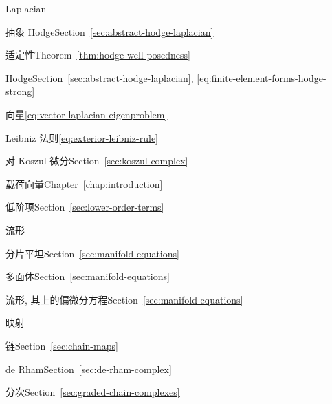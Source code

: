\begin{theindex}
\item {}\label{index:laplacian}{Laplacian}

\subitem {}\label{index:laplacian-abstract-hodge}{抽象 Hodge}\quad Section~\ref{sec:abstract-hodge-laplacian}

\subsubitem {}\label{index:laplacian-abstract-hodge-well-posedness-of}{适定性}\quad Theorem~\ref{thm:hodge-well-posedness}

\subitem {}\label{index:laplacian-hodge}{Hodge}\quad Section~\ref{sec:abstract-hodge-laplacian}, \eqref{eq:finite-element-forms-hodge-strong}

\subitem {}\label{index:laplacian-vector}{向量}\quad \eqref{eq:vector-laplacian-eigenproblem}

\item {}\label{index:leibniz-rule}{Leibniz 法则}\quad \eqref{eq:exterior-leibniz-rule}

\subitem {}\label{index:leibniz-rule-for-koszul-differential}{对 Koszul 微分}\quad Section~\ref{sec:koszul-complex}

\item {}\label{index:load-vector}{载荷向量}\quad Chapter~\ref{chap:introduction}

\item {}\label{index:lower-order-terms}{低阶项}\quad Section~\ref{sec:lower-order-terms}

\item {}\label{index:manifold}{流形}

\subitem {}\label{index:manifold-piecewise-flat}{分片平坦}\quad Section~\ref{sec:manifold-equations}

\subitem {}\label{index:manifold-polyhedral}{多面体}\quad Section~\ref{sec:manifold-equations}

\item {}\label{index:manifolds-pdes-on}{流形, 其上的偏微分方程}\quad Section~\ref{sec:manifold-equations}

\item {}\label{index:map}{映射}

\subitem {}\label{index:map-chain}{链}\quad Section~\ref{sec:chain-maps}

\subitem {}\label{index:map-de-rham}{de Rham}\quad Section~\ref{sec:de-rham-complex}

\subitem {}\label{index:map-graded}{分次}\quad Section~\ref{sec:graded-chain-complexes}


\end{theindex}
